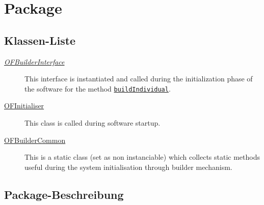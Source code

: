 
\chapter[Package ontologyFramework.OFRunning.OFInitialising]{Package }\label{ontologyFramework.OFRunning.OFInitialising-package}



\section{Klassen-Liste}
\begin{description}
\item[{\textit{\hyperlink{ontologyFramework.OFRunning.OFInitialising.OFBuilderInterface<T>-class}{OFBuilderInterface}}}]
This interface is instantiated and called during the initialization phase of the software
 for the method \texttt{\hyperlink{ontologyFramework.OFRunning.OFInitialising.OFInitialiser.buildIndividual(org.semanticweb.owlapi.model.OWLNamedIndividual,ontologyFramework.OFContextManagement.OWLReferences)}{buildIndividual}}.
\hfill\pageref{ontologyFramework.OFRunning.OFInitialising.OFBuilderInterface<T>-class}

\item[{\hyperlink{ontologyFramework.OFRunning.OFInitialising.OFInitialiser-class}{OFInitialiser}}]
This class is called during software startup.
\hfill\pageref{ontologyFramework.OFRunning.OFInitialising.OFInitialiser-class}

\item[{\hyperlink{ontologyFramework.OFRunning.OFInitialising.OFBuilderCommon-class}{OFBuilderCommon}}]
\par 
 This is a static class (set as non instanciable) which collects
 static methods useful during the system initialisation through 
 builder mechanism.
\hfill\pageref{ontologyFramework.OFRunning.OFInitialising.OFBuilderCommon-class}

\end{description}
\section{Package-Beschreibung}




